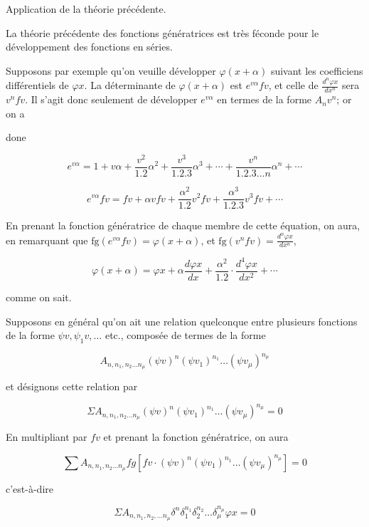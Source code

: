 \documentclass{article}
\begin{document}
Application de la théorie précédente.

La théorie précédente des fonctions génératrices est très féconde pour le développement des fonctions en séries.

Supposons par exemple qu'on veuille développer \(\varphi(x+\alpha)\) suivant les coefficiens différentiels de \(\varphi x\). La déterminante de \(\varphi(x+\alpha)\) est \(e^{v \alpha} f v\), et celle de \(\frac{d^{n} \varphi x}{d x^{n}}\) sera \(v^{n} f v\). Il s'agit donc seulement de développer \(e^{v \alpha}\) en termes de la forme \(A_{n} v^{n}\); or on a

done

\[
e^{v \alpha}=1+v \alpha+\frac{v^{2}}{1.2} \alpha^{2}+\frac{v^{3}}{1.2 .3} \alpha^{3}+\cdots+\frac{v^{n}}{1.2 .3 \ldots n} \alpha^{n}+\cdots
\]

\[
e^{v \alpha} f v=f v+\alpha v f v+\frac{\alpha^{2}}{1.2} v^{2} f v+\frac{\alpha^{3}}{1.2 .3} v^{3} f v+\cdots
\]

En prenant la fonction génératrice de chaque membre de cette équation, on aura, en remarquant que \(\mathrm{fg}\left(e^{v \alpha} f v\right)=\varphi(x+\alpha)\), et \(\mathrm{fg}\left(v^{n} f v\right)=\frac{d^{n} \varphi x}{d x^{n}}\),

\[
\varphi(x+\alpha)=\varphi x+\alpha \frac{d \varphi x}{d x}+\frac{\alpha^{2}}{1.2} \cdot \frac{d^{4} \varphi x}{d x^{2}}+\cdots
\]

comme on sait.

Supposons en général qu'on ait une relation quelconque entre plusieurs fonctions de la forme \(\psi v, \psi_{1} v, \ldots\) etc., composée de termes de la forme

\[
A_{n, n_{1}, n_{2} \ldots n_{\mu}}(\psi v)^{n}\left(\psi v_{1}\right)^{n_{1}} \ldots\left(\psi v_{\mu}\right)^{n_{\mu}}
\]

et désignons cette relation par

\[
\Sigma A_{n, n_{1}, n_{2} \ldots n_{\mu}}(\psi v)^{n}\left(\psi v_{1}\right)^{n_{1}} \ldots\left(\psi v_{\mu}\right)^{n_{\mu}}=0
\]

En multipliant par \(f v\) et prenant la fonction génératrice, on aura

\[
\sum A_{n, n_{1}, n_{2} \ldots n_{\mu}} f g\left[f v \cdot(\psi v)^{n}\left(\psi v_{1}\right)^{n_{1}} \ldots\left(\psi v_{\mu}\right)^{n_{\mu}}\right]=0
\]

c'est-à-dire

\[
\Sigma A_{n, n_{1}, n_{2}, \ldots n_{\mu}} \delta^{n} \delta_{1}^{n_{1}} \delta_{2}^{n_{2}} \ldots \delta_{\mu}^{n_{\mu}} \varphi x=0
\]
\end{document}
